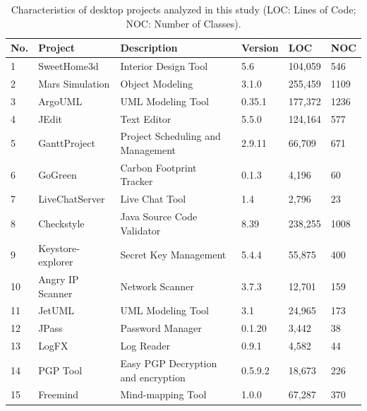 \documentclass[AMA,Times1COL]{WileyNJDv5} %
\begin{document}
\begin{table}[t]
	\centering %
	\caption{Characteristics of desktop projects analyzed in this study (LOC: Lines of Code; NOC: Number of Classes). } %
	\begin{tabular*}{\textwidth}{@{\extracolsep\fill}llllll@{\extracolsep\fill}}%
		\toprule
		\textbf{No.} & \textbf{Project} & \textbf{Description}  & \textbf{Version} & \textbf{LOC} & \textbf{NOC} \\ 
			\midrule
		1 & SweetHome3d & Interior Design Tool & 5.6 & 104,059 & 546 \\ 
		 2 & Mars Simulation & Object Modeling & 3.1.0  & 255,459 & 1109 \\ 
		3 & ArgoUML & UML Modeling Tool & 0.35.1 & 177,372 & 1236 \\ 
		 4 & JEdit & Text Editor & 5.5.0 & 124,164 & 577 \\ 
		5 & GanttProject & Project Scheduling  and Management & 2.9.11 & 66,709 & 671 \\ 
		 6 & GoGreen & Carbon Footprint Tracker & 0.1.3 & 4,196 & 60 \\  
		7 & LiveChatServer & Live Chat Tool & 1.4 & 2,796 & 23 \\ 
		 8 & Checkstyle &  Java Source Code Validator  & 8.39 & 238,255 & 1008 \\ 
		9 & Keystore-explorer & Secret Key Management & 5.4.4 & 55,875 & 400 \\ 
		 10 & Angry IP Scanner & Network Scanner & 3.7.3 & 12,701 & 159 \\
		11 & JetUML & UML Modeling Tool & 3.1 & 24,965 & 173 \\ 
		 12 & JPass & Password Manager &  0.1.20 & 3,442 & 38 \\ 
		13 & LogFX & Log Reader & 0.9.1 & 4,582 & 44 \\ 
		 14 & PGP Tool & Easy PGP Decryption  and encryption  & 0.5.9.2 & 18,673 & 226 \\ 
		15 & Freemind & Mind-mapping Tool & 1.0.0 & 67,287 & 370 \\  
		\bottomrule
	\end{tabular*}
	\label{table:selected_projects-desktop} %
\end{table}
\end{document}
